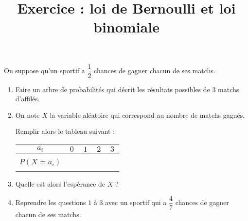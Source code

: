 \documentclass[
	classe=$1^{ere}STI2D$
]{automatisme}
\title{Exercice : loi de Bernoulli et loi binomiale}
\date{}
\begin{document}
\begin{frame}
	\maketitle

	\vspace*{-5em}
	On suppose qu'un sportif a $\dfrac{1}{2}$ chances de gagner chacun de ses matchs.

	\begin{enumerate}
		\item Faire un arbre de probabilités qui décrit les résultats possibles de $3$ matchs d'affilés.
		\item On note $X$ la variable aléatoire qui correspond au nombre de matchs gagnés.

		      Remplir alors le tableau suivant :
		      \begin{center}
			      \begin{tabular}{|c|c|c|c|c|}
				      \hline
				      $a_i$        & $0$                         & $1$                         & $2$                         & $3$                         \\ \hline
				      $P(X = a_i)$ & $\correction{\dfrac{1}{8}}$ & $\correction{\dfrac{3}{8}}$ & $\correction{\dfrac{3}{8}}$ & $\correction{\dfrac{1}{8}}$ \\ \hline
			      \end{tabular}
		      \end{center}
		\item Quelle est alors l'espérance de $X$ ? 
		\item Reprendre les questions $1$ à $3$ avec un sportif qui a $\dfrac{4}{7}$ chances de gagner chacun de ses matchs.
	\end{enumerate}
\end{frame}
\end{document}
